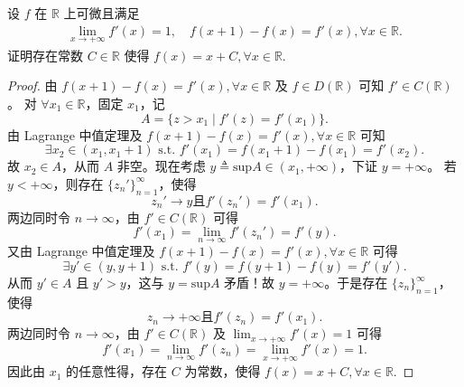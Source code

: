 \documentclass[../../main.tex]{subfiles}%
\begin{document}
\begin{proposition}[时滞方程]\label{proposition:时滞方程}
设 $f$ 在 $\mathbb{R}$ 上可微且满足
\begin{align*}
\lim_{x \to +\infty} f'(x) = 1, \quad
f(x+1) - f(x) = f'(x), \forall x \in \mathbb{R}.
\end{align*}
证明存在常数 $C \in \mathbb{R}$ 使得 $f(x) = x + C, \forall x \in \mathbb{R}$.
\end{proposition}
\begin{proof}

由 \( f(x+1)-f(x)=f'(x),\forall x\in \mathbb{R} \) 及 \( f\in D(\mathbb{R}) \) 可知 \( f' \in C(\mathbb{R}) \)。
对 \(\forall x_1\in \mathbb{R} \)，固定 \( x_1 \)，记
\[ A=\{ z>x_1 \mid f'(z) = f'(x_1) \} .\]
由 Lagrange 中值定理及 \( f(x+1)-f(x)=f'(x),\forall x\in \mathbb{R} \) 可知
\[ \exists x_2\in (x_1,x_1+1) \,\,\mathrm{s}.\mathrm{t}.\,\, f'(x_1) = f(x_1+1) - f(x_1) = f'(x_2) .\]
故 \( x_2 \in A \)，从而 \( A \) 非空。现在考虑 \( y \triangleq \mathrm{sup}A \in (x_1,+\infty) \)，下证 \( y=+\infty \)。
若 \( y<+\infty \)，则存在 \(\{ z_{n}' \}_{n=1}^{\infty} \)，使得
\[ z_{n}' \rightarrow y \text{且} f'(z_{n}') = f'(x_1) .\]
两边同时令 \( n \rightarrow \infty \)，由 \( f' \in C(\mathbb{R}) \) 可得
\[ f'(x_1) = \lim_{n \rightarrow \infty} f'(z_{n}') = f'(y) .\]
又由 Lagrange 中值定理及 \( f(x+1)-f(x)=f'(x),\forall x\in \mathbb{R} \) 可得
\[ \exists y' \in (y,y+1) \,\,\mathrm{s}.\mathrm{t}.\,\, f'(y) = f(y+1) - f(y) = f'(y') .\]
从而 \( y' \in A \) 且 \( y' > y \)，这与 \( y=\mathrm{sup}A \) 矛盾！故 \( y=+\infty \)。于是存在 \(\{ z_n \}_{n=1}^{\infty} \)，使得
\[ z_n \rightarrow +\infty \text{且} f'(z_n) = f'(x_1) .\]
两边同时令 \( n \rightarrow \infty \)，由 \( f' \in C(\mathbb{R}) \) 及 \(\lim_{x \rightarrow +\infty} f'(x) = 1 \) 可得
\[ f'(x_1) = \lim_{n \rightarrow \infty} f'(z_n) = \lim_{x \rightarrow +\infty} f'(x) = 1 .\]
因此由 \( x_1 \) 的任意性得，存在 \( C \) 为常数，使得 \( f(x) = x+C,\forall x\in \mathbb{R} \).

\end{proof}
\end{document}
